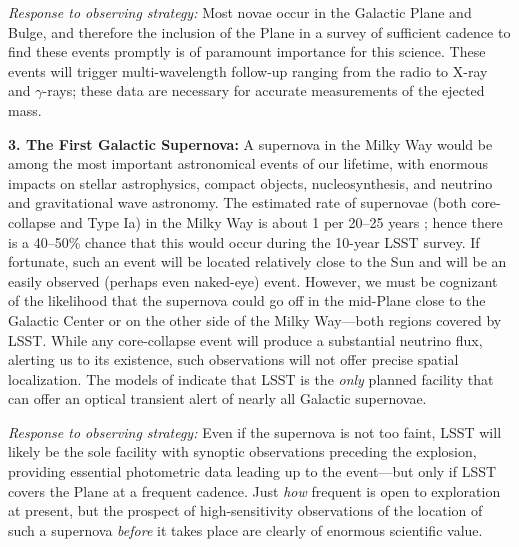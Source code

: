 {\it Response to observing strategy:} Most novae occur in the Galactic
Plane and Bulge, and therefore the inclusion of the Plane in a survey
of sufficient cadence to find these events promptly is of paramount
importance for this science. These events will trigger
multi-wavelength follow-up ranging from the radio to X-ray and
$\gamma$-rays; these data are necessary for accurate measurements of
the ejected mass.

{\bf 3. The First Galactic Supernova:} A supernova in the Milky Way
would be among the most important astronomical events of our lifetime,
with enormous impacts on stellar astrophysics, compact objects,
nucleosynthesis, and neutrino and gravitational wave astronomy. The
estimated rate of supernovae (both core-collapse and Type Ia) in the
Milky Way is about 1 per 20--25 years \citep{2013ApJ...778..164A}; hence there
is a 40--50\% chance that this would occur during the 10-year LSST
survey. If fortunate, such an event will be located relatively close
to the Sun and will be an easily observed (perhaps even naked-eye)
event. However, we must be cognizant of the likelihood that the
supernova could go off in the mid-Plane close to the Galactic Center
or on the other side of the Milky Way---both regions covered by
LSST. While any core-collapse event will produce a substantial
neutrino flux, alerting us to its existence, such observations will
not offer precise spatial localization. The models of \citet{2013ApJ...778..164A}
indicate that LSST is the \emph{only} planned facility that
can offer an optical transient alert of nearly all Galactic
supernovae.

{\it Response to observing strategy:} Even if the supernova is not too
faint, LSST will likely be the sole facility with synoptic
observations preceding the explosion, providing essential photometric
data leading up to the event---but only if LSST covers the Plane at a
frequent cadence. Just {\it how} frequent is open to exploration at
present, but the prospect of high-sensitivity observations of the
location of such a supernova {\it before} it takes place are clearly
of enormous scientific value.



